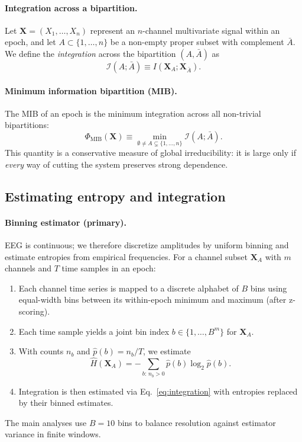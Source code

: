 \documentclass[11pt]{article}
\begin{document}
\paragraph{Integration across a bipartition.}
Let $\mathbf{X}=(X_1,\dots,X_n)$ represent an $n$-channel multivariate signal within an epoch, and let $A \subset \{1,\dots,n\}$ be a non-empty proper subset with complement $\bar{A}$. We define the \emph{integration} across the bipartition $(A,\bar{A})$ as
\begin{equation}
\mathcal{I}(A;\bar{A}) \equiv I(\mathbf{X}_A;\mathbf{X}_{\bar{A}}).
\label{eq:integration}
\end{equation}

\paragraph{Minimum information bipartition (MIB).}
The MIB of an epoch is the minimum integration across all non-trivial bipartitions:
\begin{equation}
\Phi_{\mathrm{MIB}}(\mathbf{X})
\equiv \min_{\emptyset \neq A \subsetneq \{1,\dots,n\}} \mathcal{I}(A;\bar{A}).
\label{eq:mib}
\end{equation}
This quantity is a conservative measure of global irreducibility: it is large only if \emph{every} way of cutting the system preserves strong dependence.

\subsection{Estimating entropy and integration}
\paragraph{Binning estimator (primary).}
EEG is continuous; we therefore discretize amplitudes by uniform binning and estimate entropies from empirical frequencies. For a channel subset $\mathbf{X}_A$ with $m$ channels and $T$ time samples in an epoch:
\begin{enumerate}[leftmargin=*]
    \item Each channel time series is mapped to a discrete alphabet of $B$ bins using equal-width bins between its within-epoch minimum and maximum (after z-scoring).
    \item Each time sample yields a joint bin index $b \in \{1,\dots,B^{m}\}$ for $\mathbf{X}_A$.
    \item With counts $n_b$ and $\hat{p}(b)=n_b/T$, we estimate
    \begin{equation}
        \widehat{H}(\mathbf{X}_A) = -\sum_{b:\,n_b>0}\hat{p}(b)\log_{2}\hat{p}(b).
        \label{eq:binning_entropy}
    \end{equation}
    \item Integration is then estimated via Eq.~\eqref{eq:integration} with entropies replaced by their binned estimates.
\end{enumerate}
The main analyses use $B=10$ bins to balance resolution against estimator variance in finite windows.
\end{document}
